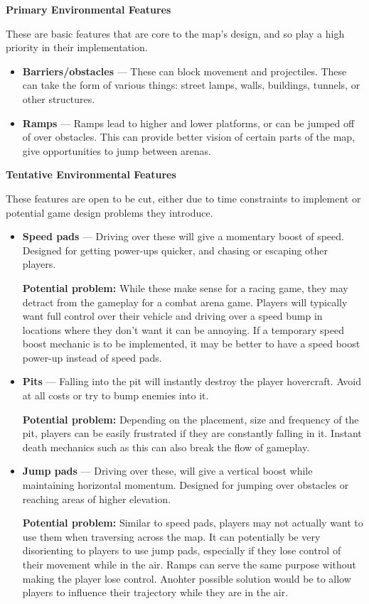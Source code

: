 \documentclass{article}
\theoremstyle{definition}
\begin{document}
\textbf{Primary Environmental Features}

These are basic features that are core to the map's design, and so play a high
priority  in their implementation.

\begin{itemize}
  \item \textbf{Barriers/obstacles} --- These can block movement and
    projectiles. These can take the form of various things: street lamps,
    walls, buildings, tunnels, or other structures.
  \item \textbf{Ramps} --- Ramps lead to higher and lower platforms, or can be jumped
    off of over obstacles. This can provide better vision of certain parts of
    the map, give opportunities to jump between arenas.
\end{itemize}

\textbf{Tentative Environmental Features}

These features are open to be cut, either due to time constraints to implement
or potential game design problems they introduce.

\begin{itemize}
  \item \textbf{Speed pads} --- Driving over these will give a momentary boost of
    speed. Designed for getting power-ups quicker, and chasing or escaping
    other players.

    \textbf{Potential problem:} While these make sense for a racing game, they
    may detract from the gameplay for a combat arena game. Players will
    typically want full control over their vehicle and driving over a speed
    bump in locations where they don't want it can be annoying. If a temporary
    speed boost mechanic is to be implemented, it may be better to have a speed
    boost power-up instead of speed pads.
  \item \textbf{Pits} --- Falling into the pit will instantly destroy the player
    hovercraft. Avoid at all costs or try to bump enemies into it.

    \textbf{Potential problem:} Depending on the placement, size and frequency
    of the pit, players can be easily frustrated if they are constantly
    falling in it. Instant death mechanics such as this can also break the flow
    of gameplay.
  \item \textbf{Jump pads} --- Driving over these, will give a vertical boost
    while maintaining horizontal momentum. Designed for jumping over obstacles
    or reaching areas of higher elevation.

    \textbf{Potential problem:} Similar to speed pads, players may not
    actually want to use them when traversing across the map. It can
    potentially be very disorienting to players to use jump pads, especially if
    they lose control of their movement while in the air. Ramps can serve the
    same purpose without making the player lose control. Anohter possible
    solution would be to allow players to influence their trajectory while they
    are in the air.
\end{itemize}
\end{document}
